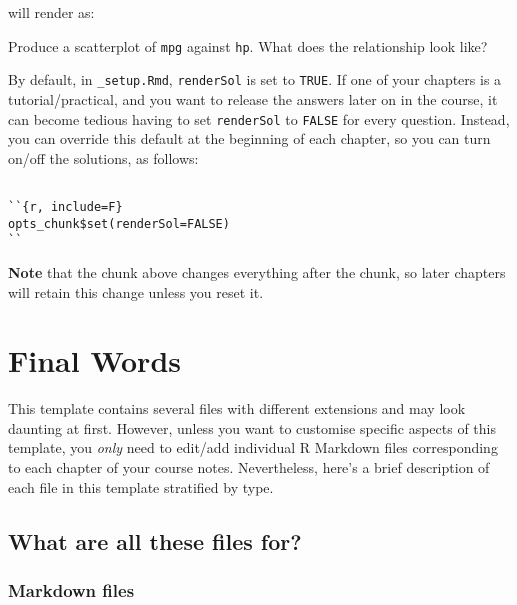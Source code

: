 \documentclass[
  oneside]{krantz}
\newcommand{\bblockT}[2][Task]{\begin{tcolorbox}[title = #1 #2, parbox = false]}
\newcommand{\eblockT}{\end{tcolorbox}}
\theoremstyle{definition}
\theoremstyle{definition}
\theoremstyle{definition}
\theoremstyle{remark}
\begin{document}
will render as:

\hypertarget{tsk7}{}\bblockT[Task (solution hidden)]{\phantomsection\label{sol7}7}

Produce a scatterplot of \texttt{mpg} against \texttt{hp}. What does the relationship look like?
\eblockT

By default, in \texttt{\_setup.Rmd}, \texttt{renderSol} is set to \texttt{TRUE}. If one of your chapters is a tutorial/practical, and you want to release the answers later on in the course,
it can become tedious having to set \texttt{renderSol} to \texttt{FALSE} for every question.
Instead, you can override this default at the beginning of each chapter, so you can turn on/off the solutions, as follows:

\begin{verbatim}

``{r, include=F}
opts_chunk$set(renderSol=FALSE)
``
\end{verbatim}

\textbf{Note} that the chunk above changes everything after the chunk, so later chapters will retain this change unless you reset it.

\hypertarget{final-words}{%
\chapter{Final Words}\label{final-words}}

This template contains several files with different extensions and may look daunting at first. However, unless you want to customise specific aspects of this template, you \emph{only} need to edit/add individual R Markdown files corresponding to each chapter of your course notes. Nevertheless, here's a brief description of each file in this template stratified by type.

\hypertarget{what-are-all-these-files-for}{%
\section{What are all these files for?}\label{what-are-all-these-files-for}}

\hypertarget{markdown-files}{%
\subsection*{Markdown files}\label{markdown-files}}
\end{document}
